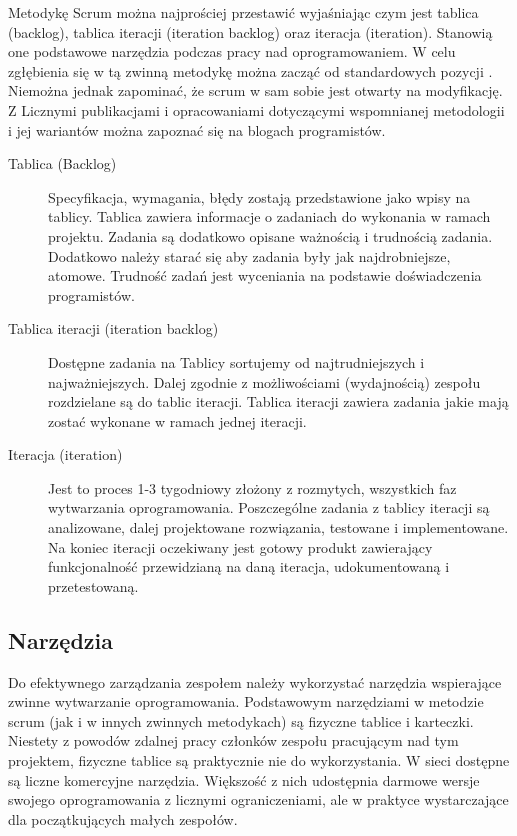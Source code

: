 Metodykę Scrum można najprościej przestawić wyjaśniając czym jest tablica (backlog), tablica iteracji (iteration backlog) oraz iteracja (iteration). Stanowią one podstawowe narzędzia podczas pracy nad oprogramowaniem. W celu zgłębienia się w tą zwinną metodykę można zacząć od standardowych pozycji \cite{scrumalliance} \cite{scrum_wiki}. Niemożna jednak zapominać, że scrum w sam sobie jest otwarty na modyfikację. Z Licznymi publikacjami i opracowaniami dotyczącymi wspomnianej metodologii i jej wariantów można zapoznać się na blogach programistów.  

\begin{description}

\item[Tablica (Backlog)]\hfill
Specyfikacja, wymagania, błędy zostają przedstawione jako wpisy na tablicy. Tablica zawiera informacje o zadaniach do wykonania w ramach projektu. Zadania są dodatkowo opisane ważnością i trudnością zadania. Dodatkowo należy starać się aby zadania były jak najdrobniejsze, atomowe. Trudność zadań jest wyceniania na podstawie doświadczenia programistów.

\item[Tablica iteracji (iteration backlog)]\hfill
Dostępne zadania na Tablicy sortujemy od najtrudniejszych i najważniejszych. Dalej zgodnie z możliwościami (wydajnością) zespołu rozdzielane są do tablic iteracji. Tablica iteracji zawiera zadania jakie mają zostać wykonane w ramach jednej iteracji. 

\item[Iteracja (iteration)]\hfill
Jest to proces 1-3 tygodniowy złożony z rozmytych, wszystkich faz wytwarzania oprogramowania. Poszczególne zadania z tablicy iteracji są analizowane, dalej projektowane rozwiązania, testowane i implementowane. Na koniec iteracji oczekiwany jest gotowy produkt zawierający funkcjonalność przewidzianą na daną iteracja, udokumentowaną i przetestowaną.

\end{description}

\subsection{Narzędzia}

Do efektywnego zarządzania zespołem należy wykorzystać narzędzia wspierające zwinne wytwarzanie oprogramowania. Podstawowym narzędziami w metodzie scrum (jak i w innych zwinnych metodykach) są fizyczne tablice i karteczki. Niestety z powodów zdalnej pracy członków zespołu pracującym nad tym projektem, fizyczne tablice są praktycznie nie do wykorzystania. W sieci dostępne są liczne komercyjne narzędzia. Większość z nich udostępnia darmowe wersje swojego oprogramowania z licznymi ograniczeniami, ale w praktyce wystarczające dla początkujących małych zespołów.  

